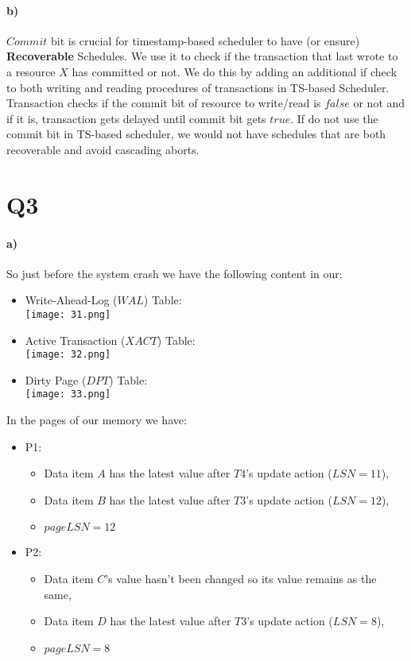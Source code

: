 \documentclass[a4paper,12pt]{article}
\begin{document}
\paragraph{b)} $Commit$ bit is crucial for timestamp-based scheduler to have (or ensure) \textbf{Recoverable} Schedules. We use it to check if the transaction that last wrote to a resource $X$ has committed or not. We do this by adding an additional if check to both writing and reading procedures of transactions in TS-based Scheduler. Transaction checks if the commit bit of resource to write/read is $false$ or not and if it is, transaction gets delayed until commit bit gets $true$. If do not use the commit bit in TS-based scheduler, we would not have schedules that are both recoverable and avoid cascading aborts.

\newpage
\section{Q3}

\paragraph{a)} So just before the system crash we have the following content in our: \\
\begin{itemize}
    \item Write-Ahead-Log ($WAL$) Table: \\
        \texttt{[image: 31.png]} \\
    \item Active Transaction ($XACT$) Table: \\
        \texttt{[image: 32.png]} \\
    \item Dirty Page ($DPT$) Table: \\
        \texttt{[image: 33.png]} \\
\end{itemize}
In the pages of our memory we have:
\begin{itemize}
    \item P1:
    \begin{itemize}
        \item Data item $A$ has the latest value after $T4$’s update action ($LSN=11$),
        \item Data item $B$ has the latest value after $T3$’s update action ($LSN=12$),
        \item $pageLSN=12$ 
    \end{itemize}
    \newpage
    \item P2:
    \begin{itemize}
        \item Data item $C$'s value hasn’t been changed so its value remains as the same,
        \item Data item $D$ has the latest value after $T3$’s update action ($LSN=8$),
        \item $pageLSN=8$ 
    \end{itemize}
\end{itemize}
\end{document}
